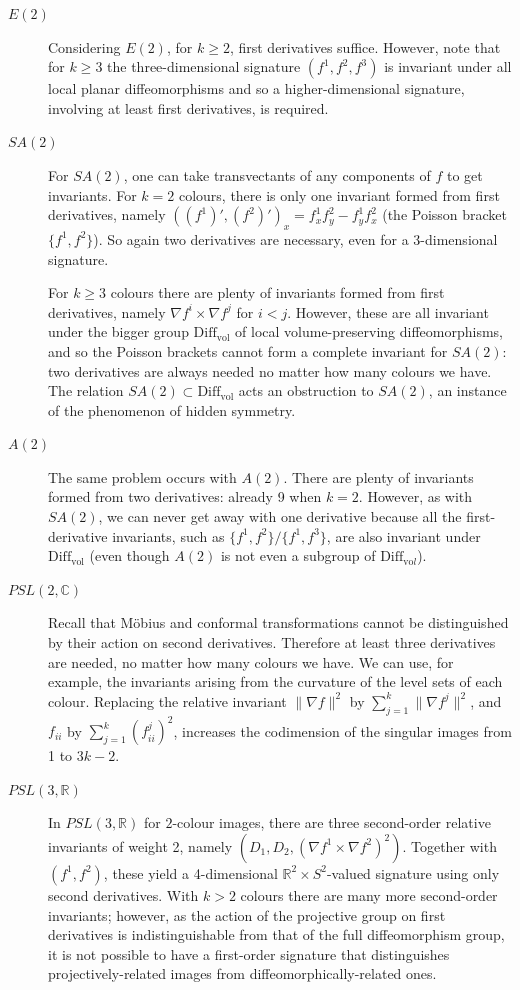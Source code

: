 \documentclass[review,onefignum,onetabnum]{siamonline190516}
\begin{document}
{\begin{description}
\item[$E(2)$]
Considering $E(2)$, for $k\ge 2$, first derivatives suffice. However, note that for $k\ge 3$ the three-dimensional signature $(f^1,f^2,f^3)$ is invariant under all local planar diffeomorphisms and so a higher-dimensional signature, involving at least first derivatives, is required.
\item[$SA(2)$]
For $SA(2)$, one can take transvectants of any components of $f$ to get invariants. For $k=2$ colours, there is only one  invariant formed from first derivatives, namely $((f^1)',(f^2)')_x = f^1_x f^2_y - f^1_y f^2_x$ (the Poisson bracket $\{f^1,f^2\}$). So again two derivatives are necessary, even for a 3-dimensional signature.

For $k\ge 3$ colours there are plenty of invariants formed from first derivatives, namely $\nabla f^i \times \nabla f^j$ for $i<j$. However, these are all invariant under the bigger group $\mathrm{Diff}_{\mathrm{vol}}$ of local volume-preserving diffeomorphisms, and so the Poisson brackets cannot form a complete invariant for $SA(2)$: two derivatives are always needed no matter how many colours we have. The relation $SA(2)\subset \mathrm{Diff}_{\mathrm{vol}}$ acts an obstruction to $SA(2)$, an instance of the phenomenon of hidden symmetry.
\item[$A(2)$]
The same problem occurs with $A(2)$. There are plenty of invariants formed from two derivatives: already 9 when $k=2$. However, as with $SA(2)$, we can never get away with one derivative because all the first-derivative invariants, such as $\{f^1,f^2\}/\{f^1,f^3\}$, are also invariant under $\mathrm{Diff}_{\mathrm{vol}}$ (even though $A(2)$ is not even a subgroup of $\mathrm{Diff}_{\mathrm{vo}l}$).
\item[$PSL(2,\mathbb{C})$]
Recall that M\"obius and conformal transformations cannot be distinguished by their action on second derivatives. Therefore at least three derivatives are needed, no matter how many colours we have. We can use, for example, the invariants arising from the curvature of the level sets of each colour. Replacing the relative invariant $\|\nabla f\|^2$ by $\sum_{j=1}^k \|\nabla f^j\|^2$, and $f_{ii}$ by $\sum_{j=1}^k (f^j_{ii})^2$, increases the codimension of the singular images from 1 to $3k-2$.
\item[$PSL(3,\mathbb{R})$]
In $PSL(3, \mathbb{R})$ for $2$-colour images, there are three second-order relative invariants of weight 2, namely $(D_1,D_2,(\nabla f^1\times \nabla f^2)^2)$. Together with $(f^1,f^2)$, these yield a 4-dimensional $\mathbb{R}^2\times S^2$-valued signature using only second derivatives. With $k>2$ colours there are many more second-order invariants; however, as the action of the projective group on first derivatives is indistinguishable from that of the full diffeomorphism group, it is not possible to have a first-order signature that distinguishes projectively-related images from diffeomorphically-related ones.

\end{description}}
\end{document}
